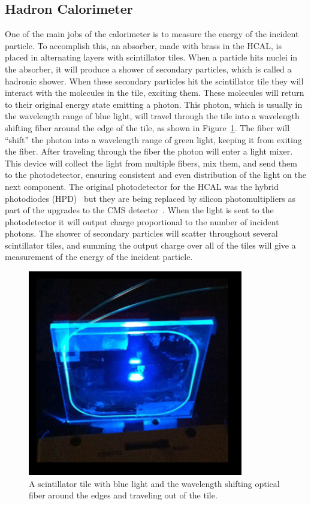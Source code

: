 \subsection{Hadron Calorimeter} \label{HCAL}
One of the main jobs of the calorimeter is to measure the energy of the incident particle. To accomplish this, an absorber, made with brass in the HCAL, is placed in alternating layers with scintillator tiles. When a particle hits nuclei in the absorber, it will produce a shower of secondary particles, which is called a hadronic shower. When these secondary particles hit the scintillator tile they will interact with the molecules in the tile, exciting them. These molecules will return to their original energy state emitting a photon. This photon, which is usually in the wavelength range of blue light, will travel through the tile into a wavelength shifting fiber around the edge of the tile, as shown in Figure~\ref{fig:Tile}. The fiber will ``shift'' the photon into a wavelength range of green light, keeping it from exiting the fiber. After traveling through the fiber the photon will enter a light mixer. This device will collect the light from multiple fibers, mix them, and send them to the photodetector, ensuring consistent and even distribution of the light on the next component. The original photodetector for the HCAL was the hybrid photodiodes (HPD)~\cite{HPD} but they are being replaced by silicon photomultipliers as part of the upgrades to the CMS detector~\cite{HCALPhase1}. When the light is sent to the photodetector it will output charge proportional to the number of incident photons. The shower of secondary particles will scatter throughout several scintillator tiles, and summing the output charge over all of the tiles will give a measurement of the energy of the incident particle. 
\begin{figure}
\centering
\includegraphics[width=0.6\linewidth]{Figures/Tile.png}
\caption{A scintillator tile with blue light and the wavelength shifting optical fiber around the edges and traveling out of the tile.}
\label{fig:Tile}
\end{figure}


